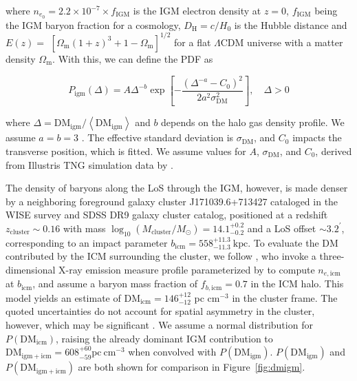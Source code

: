 \documentclass[twocolumn, linenumbers, tra]{aastex631}
\newcommand{\rev}[1]{{\color{purple}#1}}
\begin{document}
\noindent
where $n_{e_0}=2.2 \times 10^{-7} \times f_{\mathrm{IGM}}$ is the IGM electron density at $z=0$, $f_{\mathrm{IGM}}$ being the IGM baryon fraction for a \cite{Planck2018} cosmology, $D_{\mathrm{H}}=c / H_0$ is the Hubble distance and $E(z)=$ $\left[\Omega_{\mathrm{m}}(1+z)^3+1-\Omega_{\mathrm{m}}\right]^{1 / 2}$ for a flat $\Lambda$CDM universe with a matter density $\Omega_{\mathrm{m}}$. With this, we can define the PDF as

\begin{equation}\label{eq:Pdmigm}
P_{\mathrm{igm}}(\Delta) = A \Delta^{-b} \exp \left[-\frac{\left(\Delta^{-a}-C_0\right)^2}{2 a^2 \sigma_{\mathrm{DM}}^2}\right], \quad \Delta>0
\end{equation}

\noindent
where $\Delta=\mathrm{DM}_{\mathrm{igm}} /\left\langle\mathrm{DM}_{\mathrm{igm}}\right\rangle$ and $b$ depends on the halo gas density profile. We assume $a = b = 3$ \citep{Macquart2020}. The effective standard deviation is $\sigma_{\mathrm{DM}}$, and $C_0$ impacts the transverse position, which is fitted. We assume values for $A$, $\sigma_{\mathrm{DM}}$, and $C_0$, derived from Illustris TNG simulation data by \citet{Zhang2021}. 

The density of baryons along the LoS through the IGM, however, is made denser by a neighboring foreground galaxy cluster J171039.6+713427 cataloged in the WISE survey and \rev{SDSS DR9 galaxy cluster catalog}, positioned at a redshift $z_{\mathrm{cluster}} \sim 0.16$ with mass $\log_{10}(M_{\mathrm{cluster}}/M_\odot) = 14.1^{+0.2}_{-0.2}$ \citep[we adopt the quoted 0.2 dex uncertainty for cluster masses $\mathrm{log}_{10}\left(M_{\mathrm{cluster}}/M_\odot\right) \gtrsim 14$ in][]{Wen2018} and a LoS offset $ \sim 3.2^{\prime}$, corresponding to an impact parameter $b_{\mathrm{icm}} = 558^{+11.3}_{-11.3}\ \mathrm{kpc}$. To evaluate the DM contributed by the ICM surrounding the cluster, we follow \citet{Prochaska2019b}, who invoke a three-dimensional X-ray emission measure profile parameterized by \citet{Vikhlinin2006} to compute $n_{e, \mathrm{icm}}$ at $b_{\mathrm{icm}}$, and assume a baryon mass fraction of $f_{b, \mathrm{icm}} = 0.7$ in the ICM halo. This model yields an estimate of $\mathrm{DM}_{\mathrm{icm}} = 146^{+12}_{-12}$ pc cm$^{-3}$ in the cluster frame. The quoted uncertainties do not account for spatial asymmetry in the cluster, however, which may be significant \citep{Connor2023}. We assume a normal distribution for $P(\mathrm{DM}_{\mathrm{icm}})$, raising the already dominant IGM contribution to $\mathrm{DM}_{\mathrm{igm+icm}} = 608_{-59}^{+60} \mathrm{pc \ cm}^{-3}$ when convolved with $P(\mathrm{DM}_{\mathrm{igm}})$. $P\left(\mathrm{DM}_{\mathrm{igm}}\right)$ and $P\left(\mathrm{DM}_{\mathrm{igm+icm}}\right)$ are both shown for comparison in Figure\ \ref{fig:dmigm}.
\end{document}
